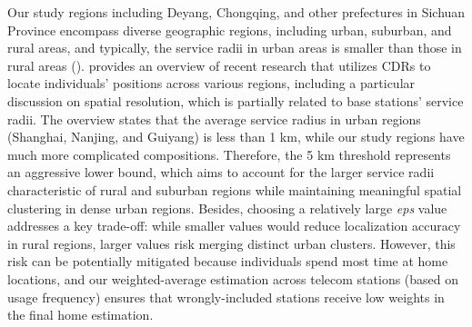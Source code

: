Our study regions including Deyang, Chongqing, and other prefectures in Sichuan Province encompass diverse geographic regions, including urban, suburban, and rural areas, and typically, the service radii in urban areas is smaller than those in rural areas (\cite{zreikat2004comparative}).
\cite{zhou2024cell} provides an overview of recent research that utilizes CDRs to locate individuals' positions across various regions, including a particular discussion on spatial resolution, which is partially related to base stations' service radii.
The overview states that the average service radius in urban regions (Shanghai, Nanjing, and Guiyang) is less than 1 km, while our study regions have much more complicated compositions.
Therefore, the 5 km threshold represents an aggressive lower bound, which aims to account for the larger service radii characteristic of rural and suburban regions while maintaining meaningful spatial clustering in dense urban regions.
Besides, choosing a relatively large \textit{eps} value addresses a key trade-off: while smaller values would reduce localization accuracy in rural regions, larger values risk merging distinct urban clusters.
However, this risk can be potentially mitigated because individuals spend most time at home locations, and our weighted-average estimation across telecom stations (based on usage frequency) ensures that wrongly-included stations receive low weights in the final home estimation.


\clearpage\newpage
